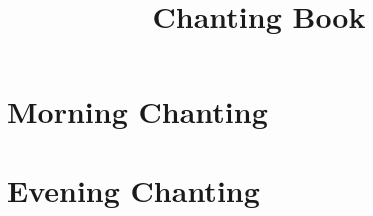 \documentclass[final]{chantingbook}
\title{Chanting Book}
\begin{document}
\frontmatter



\mainmatter


\part{Morning Chanting}



\part{Evening Chanting}



%
%

%
%
\end{document}
